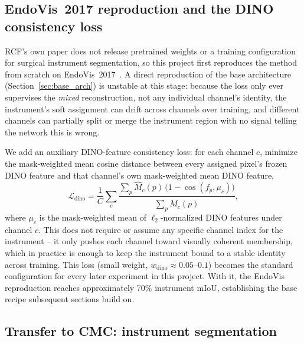 \documentclass[conference]{IEEEtran}
\begin{document}
\subsection{EndoVis~2017 reproduction and the DINO consistency loss}
\label{sec:endovis}

RCF's own paper does not release pretrained weights or a training
configuration for surgical instrument segmentation, so this project first
reproduces the method from scratch on EndoVis~2017~\cite{endovis2017}.
A direct reproduction of the base architecture (Section~\ref{sec:base_arch})
is unstable at this stage: because the loss only ever supervises the
\emph{mixed} reconstruction, not any individual channel's identity, the
instrument's soft assignment can drift across channels over training,
and different channels can partially split or merge the instrument
region with no signal telling the network this is wrong.

We add an auxiliary DINO-feature consistency loss: for each channel $c$,
minimize the mask-weighted mean cosine distance between every assigned
pixel's frozen DINO feature and that channel's own mask-weighted mean DINO
feature,
\[
\mathcal{L}_{\text{dino}} = \frac{1}{C}\sum_{c}
\frac{\sum_p \hat M_c(p)\,\big(1-\cos(f_p,\mu_c)\big)}{\sum_p \hat M_c(p)},
\]
where $\mu_c$ is the mask-weighted mean of $\ell_2$-normalized DINO
features under channel $c$. This does not require or assume any specific
channel index for the instrument -- it only pushes each channel toward
visually coherent membership, which in practice is enough to keep the
instrument bound to a stable identity across training. This loss (small
weight, $w_{\text{dino}} \approx 0.05$--$0.1$) becomes the standard
configuration for every later experiment in this project. With it, the
EndoVis reproduction reaches approximately 70\% instrument mIoU,
establishing the base recipe subsequent sections build on.

\subsection{Transfer to CMC: instrument segmentation}
\label{sec:cmc_instrument}
\end{document}
